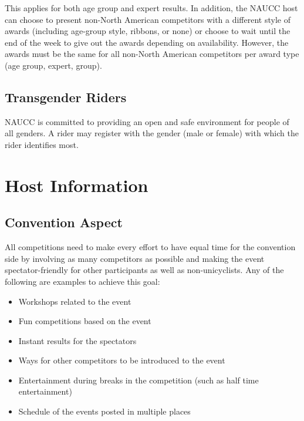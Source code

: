 This applies for both age group and expert results.
In addition, the NAUCC host can choose to present non-North American competitors with a different style of awards (including age-group style, ribbons, or none) or choose to wait until the end of the week to give out the awards depending on availability.
However, the awards must be the same for all non-North American competitors per award type (age group, expert, group).

\section{Transgender Riders}
NAUCC is committed to providing an open and safe environment for people of all genders.
A rider may register with the gender (male or female) with which the rider identifies most.

\chapter{Host Information}

\section{Convention Aspect}
All competitions need to make every effort to have equal time for the convention side by involving as many competitors as possible and making the event spectator-friendly for other participants as well as non-unicyclists.
Any of the following are examples to achieve this goal:
\begin{itemize}
  \item Workshops related to the event
  \item Fun competitions based on the event
  \item Instant results for the spectators
  \item Ways for other competitors to be introduced to the event
  \item Entertainment during breaks in the competition (such as half time entertainment)
  \item Schedule of the events posted in multiple places
\end{itemize}

